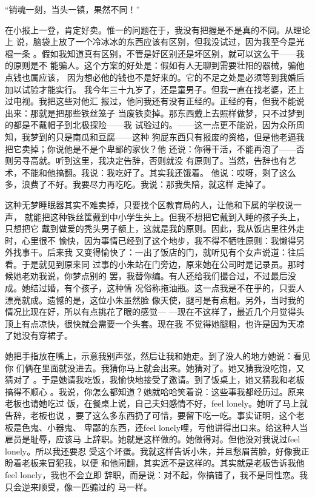“销魂一刻，当头一镇，果然不同！”

在小报上一登，肯定好卖。惟一的问题在于，我没有把握是不是真的不同。从理论上
说，脑袋上放了一个冷冰冰的东西应该有区别，但我没试过，因为我至今是光棍一条
。假如我知道真有区别，不管是好区别还是坏区别，就可以这么干——我的原则是不
能骗人。这个方案的好处是：假如有人无聊到需要壮阳的器械，骗他点钱也属应该，
因为想必他的钱也不是好来的。它的不足之处是必须等到我婚后加以试验才能实行。
我今年三十九岁了，还是童男子。但我一直在找老婆，还上过电视。我把这些对他汇
报过，他问我还有没有正经的。正经的有，但我不能说出来：那就是把那些铁丝笼子
当废铁卖掉。那东西戴上去照样做梦，只不过梦到的都是不戴帽子到北极探险——我
试验过的。——这一点更不能说，因为众所周知，我梦到的只是南瓜和豆腐——这种
狗屁东西只有报废的资格，但是他老逼我把它卖掉；你说他是不是个卑鄙的家伙？他
还说：你得干活，不能再泡了——否则另寻高就。听到这里，我决定告辞，否则就没
有原则了。当然，告辞也有艺术，不能和他搞翻。我说：我吃好了。其实我还饿着。
他说：哎呀，剩了这么多，浪费了不好。我要尽力再吃吃。我说：那我失陪，就这样
走掉了。

这种无梦睡眠器其实不难卖掉，只要找个区教育局的人，让他和下属的学校说一声，
就能把这种铁丝筐戴到中小学生头上。但我不想把它戴到入睡的孩子头上，只想把它
戴到做爱的秃头男子额上，这就是我的原则。因此，我从饭店里往外走时，心里很不
愉快，因为事情已经到了这个地步，我不得不牺牲原则：我懒得另外找事干。后来我
又变得愉快了：一出了饭店的门，就听见有个女声说道：往后看。于是就见到原来同
过事的小朱站在门旁边，原来她在公司时是记录员。那时候她老劝我说，你梦点别的
罢，我替你编。有人还给我们撮合过，不过最后没成。她结过婚，有个孩子，这种情
况俗称拖油瓶。这一点我是不在乎的，只要人漂亮就成。遗憾的是，这位小朱虽然脸
像天使，腿可是有点粗。另外，当时我的情况比现在好，所以有点挑花了眼的感觉—
—现在不这样了，最近几个月觉得头顶上有点凉快，很快就会需要一个头套。现在我
不觉得她腿粗，也许是因为天凉了她没有穿裙子。

她把手指放在嘴上，示意我别声张，然后让我和她走。到了没人的地方她说：看见你
们俩在里面就没进去。我猜你马上就会出来。她猜对了。她又猜我没吃饱，又猜对了
。于是她请我吃饭，我愉快地接受了邀请。到了饭桌上，她又猜我和老板搞得不顺心
。我说，你怎么都知道？她就哈哈笑着说：这些事我都经历过。原来老板也请她吃过
饭，在餐桌上说，自己夫妇感情不好，feel lonely。她听了马上就告辞，老板也说
，要了这么多东西扔了可惜，要留下吃一吃。事实证明，这个老板是色鬼、小器鬼、
卑鄙的东西，还feel lonely哩，亏他讲得出口来。给这种人当雇员是耻辱，应该马
上辞职。她就是这样做的。她做得对。但他没对我说过feel lonely。所以我还要忍
受这个坏蛋。我就这样告诉小朱，并且愁眉苦脸，好像我正盼着老板来冒犯我，以便
和他闹翻，其实远不是这样的。其实就是老板告诉我他feel lonely，我也不会立即
辞职，而是说：对不起，你搞错了，我不是同性恋。我只会逆来顺受，像一匹骟过的
马一样。

